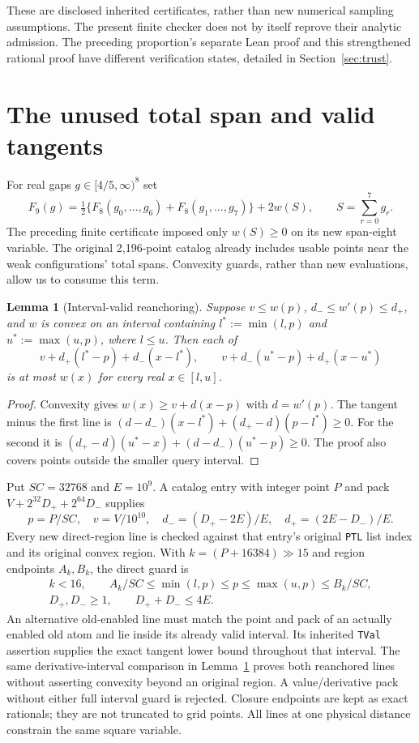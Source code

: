 \documentclass[11pt,a4paper]{article}
\newtheorem{lemma}[theorem]{Lemma}
\begin{document}
These are disclosed inherited certificates, rather than new numerical
sampling assumptions. The present finite checker does not by itself
reprove their analytic admission. The preceding proportion's separate
Lean proof and this strengthened rational proof have different
verification states, detailed in Section~\ref{sec:trust}.

\section{The unused total span and valid tangents}

For real gaps $g\in[4/5,\infty)^8$ set
\begin{equation}\label{eq:F9}
 F_9(g)=\tfrac12\{F_8(g_0,\ldots,g_6)+F_8(g_1,\ldots,g_7)\}
             +2w(S),\qquad S=\sum_{r=0}^7g_r.
\end{equation}
The preceding finite certificate imposed only $w(S)\ge0$ on its new
span-eight variable. The original 2,196-point catalog already includes
usable points near the weak configurations' total spans. Convexity
guards, rather than new evaluations, allow us to consume this term.

\begin{lemma}[Interval-valid reanchoring]\label{lem:cut}
Suppose $v\le w(p)$, $d_-\le w'(p)\le d_+$, and $w$ is convex
on an interval containing $l^*:=\min(l,p)$ and $u^*:=\max(u,p)$,
where $l\le u$. Then each of
\[
 v+d_+(l^*-p)+d_-(x-l^*),\qquad
 v+d_-(u^*-p)+d_+(x-u^*)
\]
is at most $w(x)$ for every real $x\in[l,u]$.
\end{lemma}
\begin{proof}
Convexity gives $w(x)\ge v+d(x-p)$ with $d=w'(p)$. The tangent minus
the first line is $(d-d_-)(x-l^*)+(d_+-d)(p-l^*)\ge0$.
For the second it is $(d_+-d)(u^*-x)+(d-d_-)(u^*-p)\ge0$.
The proof also covers points outside the smaller query interval.
\end{proof}

Put $SC=32768$ and $E=10^9$. A catalog entry with integer point $P$
and pack $V+2^{32}D_++2^{64}D_-$ supplies
\[
 p=P/SC,\quad v=V/10^{10},\quad
 d_-=(D_+-2E)/E,\quad d_+=(2E-D_-)/E.
\]
Every new direct-region line is checked against that entry's original
\texttt{PTL} list index and its original convex region. With
$k=(P+16384)\mathbin{\gg}15$ and region endpoints $A_k,B_k$, the
direct guard is
\[
\begin{gathered}
 k<16,\qquad A_k/SC\le\min(l,p)\le p\le\max(u,p)\le B_k/SC,\\
 D_+,D_-\ge1,\qquad D_++D_-\le4E.
\end{gathered}
\]
An alternative old-enabled line must match the point and pack of an
actually enabled old atom and lie inside its already valid interval.
Its inherited \texttt{TVal} assertion supplies the exact tangent lower
bound throughout that interval. The same derivative-interval comparison
in Lemma~\ref{lem:cut} proves both reanchored lines without asserting
convexity beyond an original region.
A value/derivative pack without either full interval guard is rejected.
Closure endpoints are kept as exact rationals; they are not truncated
to grid points. All lines at one physical distance constrain the same
square variable.
\end{document}

